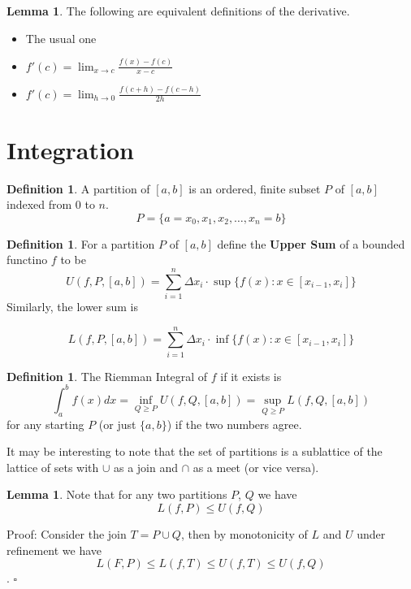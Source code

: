 \documentclass[12pt]{article}
\theoremstyle{definition}
\newtheorem{lem}[thm]{Lemma}
\newtheorem{defn}[thm]{Definition}
\begin{document}
    \begin{lem} The following are equivalent definitions of the derivative.
	\begin{itemize}
\item The usual one
\item $ f'(c)= \lim_{x\to c} \frac{f(x)-f(c)}{x-c} $  
	    \item   $ f'(c)=\lim_{h\to 0} \frac{f(c+h)-f(c-h)}{2h} $ 
	\end{itemize}
  
    \end{lem}

    \section{Integration}
    \begin{defn}
	A partition of $ [a,b] $ is an ordered, finite subset $ P $ of $ [a,b] $ indexed from $ 0  $ to $ n $. 
	$$ P = \{ a=x_0, x_1, x_2, \ldots, x_n=b \} $$ 
    \end{defn}

    \begin{defn}
	For a partition $ P $ of $ [a,b] $ define the \textbf{Upper Sum} of a bounded functino $f$ to be
	$$ U(f,P,[a,b])= \sum_{i=1}^{n} \Delta x_i \cdot \sup \{ f(x): x\in [x_{i-1}, x_i] \}  $$ 
	Similarly, the lower sum is
	
	$$ L(f,P,[a,b])= \sum_{i=1}^{n} \Delta x_i \cdot \inf \{ f(x): x\in [x_{i-1}, x_i] \}  $$ 
    \end{defn}

    \begin{defn}
    The Riemman Integral of $ f $ if it exists is 
    $$ \int_{a}^{b} f(x)  dx =\inf_{Q\geq P} U(f,Q,[a,b]) = \sup_{Q\geq P} L(f,Q,[a,b]) $$ 
   for any starting $ P $ (or just $ \{ a,b \} $)  if the two numbers agree. 
    \end{defn}
    
    It may be interesting to note that  the set of partitions is a sublattice of the lattice of sets with $ \cup $ as a join and $ \cap $  as a meet (or vice versa).

    \begin{lem}
    Note that for any two partitions $P$, $Q$ we have
    $$ L(f,P) \leq U(f,Q) $$ 
    \end{lem}

    Proof: Consider the join $ T=P\cup Q $, then by monotonicity of $ L $  and $ U $ under refinement we have 
    $$ L(F,P) \leq L(f,T)\leq U(f,T)\leq U(f,Q) $$ . $ \square $ 
\end{document}
